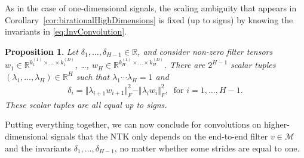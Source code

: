 \documentclass[twoside]{article}
\newtheorem{proposition}[theorem]{Proposition}
\theoremstyle{definition}
\theoremstyle{remark}
\begin{document}
As in the case of one-dimensional signals, the scaling ambiguity that appears in Corollary~\ref{cor:birationalHighDimensions} is fixed (up to signs) by knowing the invariants in \eqref{eq:InvConvolution}.

\begin{proposition}
    \label{prop:correctScalingHighDimension} 
    Let $\delta_1, \ldots, \delta_{H-1} \in \mathbb{R}$, and consider non-zero filter tensors $w_1 \in  \mathbb{R}^{k_1^{(1)} \times \ldots \times k_1^{(D)}}$, \ldots, $w_H \in \mathbb{R}^{k_H^{(1)} \times \ldots \times k_H^{(D)}}$.
    There are $2^{H-1}$ scalar tuples $(\lambda_1, \ldots, \lambda_H) \in \mathbb{R}^H$ such that $\lambda_1 \cdots \lambda_H = 1$ and 
    \begin{align*}
        \delta_i = \Vert \lambda_{i+1} w_{i+1} \Vert_F^2 -  \Vert \lambda_i w_{i} \Vert_F^2, \   \text{ for } i = 1, \ldots, H-1.
    \end{align*}
    These scalar tuples are all equal up to signs. 
\end{proposition}

Putting everything together, we can now conclude for convolutions on higher-dimensional signals that the NTK only depends on the end-to-end filter $v \in \mathcal{M}$ and the invariants $\delta_1, \ldots, \delta_{H-1}$, no matter whether some strides are equal to one.
\end{document}
